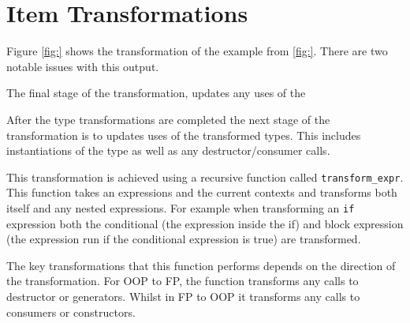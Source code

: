 \documentclass[ oneside,%
                    author={James Elgar},
                    degree={MEng},
                     title={Bidirectional transformer between functional and \\ object-oriented programming in Rust},
                  subtitle={}]{dissertation}
\begin{document}



\section{Item Transformations}
\label{sec:item-trans}

Figure \autoref{fig:} shows the transformation of the example from \autoref{fig:}. There are two notable issues with this output.

The final stage of the transformation, updates any uses of the  

After the type transformations are completed the next stage of the transformation is to updates uses of the transformed types. This includes instantiations of the type as well as any destructor/consumer calls.

This transformation is achieved using a recursive function called \verb|transform_expr|. This function takes an expressions and the current contexts and transforms both itself and any nested expressions. For example when transforming an \verb|if| expression both the conditional (the expression inside the if) and block expression (the expression run if the conditional expression is true) are transformed.

The key transformations that this function performs depends on the direction of the transformation. For OOP to FP, the function transforms any calls to destructor or generators. Whilst in FP to OOP it transforms any calls to consumers or constructors.
\end{document}
